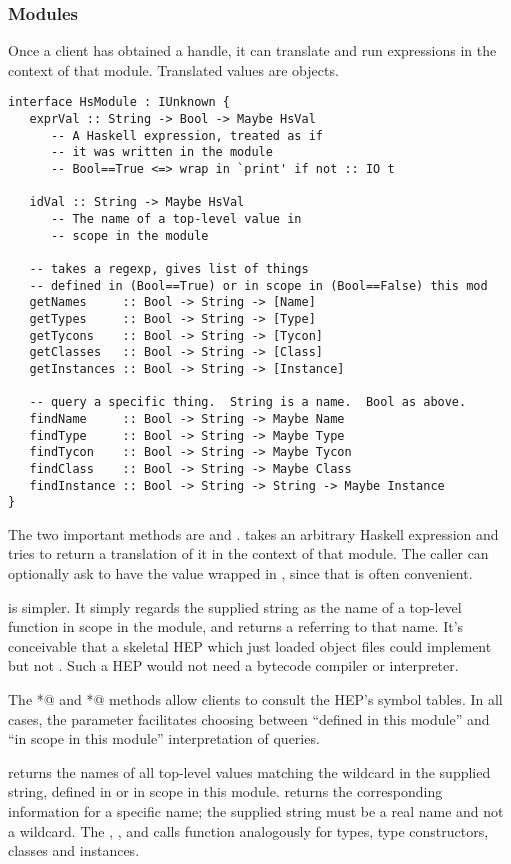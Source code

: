 \subsubsection{Modules}
Once a client has obtained a \verb@HsModule@ handle, it can
translate and run expressions in the context of that module.
Translated values are \verb@HsVal@ objects.
\begin{verbatim}
interface HsModule : IUnknown {
   exprVal :: String -> Bool -> Maybe HsVal
      -- A Haskell expression, treated as if
      -- it was written in the module
      -- Bool==True <=> wrap in `print' if not :: IO t

   idVal :: String -> Maybe HsVal
      -- The name of a top-level value in
      -- scope in the module

   -- takes a regexp, gives list of things
   -- defined in (Bool==True) or in scope in (Bool==False) this mod
   getNames     :: Bool -> String -> [Name]
   getTypes     :: Bool -> String -> [Type]
   getTycons    :: Bool -> String -> [Tycon]
   getClasses   :: Bool -> String -> [Class]
   getInstances :: Bool -> String -> [Instance]

   -- query a specific thing.  String is a name.  Bool as above.
   findName     :: Bool -> String -> Maybe Name
   findType     :: Bool -> String -> Maybe Type
   findTycon    :: Bool -> String -> Maybe Tycon
   findClass    :: Bool -> String -> Maybe Class
   findInstance :: Bool -> String -> String -> Maybe Instance
}
\end{verbatim}
The two important methods are \verb@exprVal@ and
\verb@idVal@.  \verb@exprVal@ takes an arbitrary Haskell
expression and tries to return a translation of it in the
context of that module.  The caller can optionally ask to
have the value wrapped in \verb@print@, since that is often
convenient.

\verb@idVal@ is simpler.  It simply regards the supplied string
as the name of a top-level function in scope in the module, and
returns a \verb@HsVal@ referring to that name.  It's conceivable
that a skeletal HEP which just loaded object files could implement
\verb@idVal@ but not \verb@exprVal@.  Such a HEP would not need
a bytecode compiler or interpreter.

The \verb@get*@ and \verb@find*@ methods allow clients to consult
the HEP's symbol tables.  In all cases, the \verb@Bool@
parameter facilitates choosing between ``defined in this module''
and ``in scope in this module'' interpretation of queries.

\verb@getNames@ returns the names of all top-level values
matching the wildcard in the supplied string, defined in or
in scope in this module.  \verb@findName@ returns the 
corresponding information for a specific name; the supplied
string must be a real name and not a wildcard.  The \verb@Type@,
\verb@Tycon@, \verb@Class@ and \verb@Instance@ calls function
analogously for types, type constructors, classes and instances.

